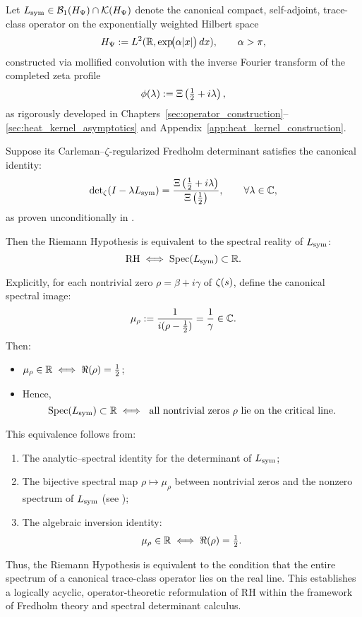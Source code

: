 \begin{theorem}
\label{thm:eq_of_rh}

Let \( L_{\mathrm{sym}} \in \mathcal{B}_1(H_{\Psi}) \cap \mathcal{K}(H_{\Psi}) \) denote the canonical compact, self-adjoint, trace-class operator on the exponentially weighted Hilbert space
\[
H_{\Psi} := L^2(\mathbb{R}, \exp\!\bigl(\alpha |x|\bigr)\,dx), \qquad \alpha > \pi,
\]
constructed via mollified convolution with the inverse Fourier transform of the completed zeta profile
\[
\phi(\lambda) := \Xi\left( \tfrac{1}{2} + i\lambda \right),
\]
as rigorously developed in Chapters~\ref{sec:operator_construction}–\ref{sec:heat_kernel_asymptotics} and Appendix~\ref{app:heat_kernel_construction}.

\medskip

Suppose its Carleman–\(\zeta\)-regularized Fredholm determinant satisfies the canonical identity:
\[
\det\nolimits_\zeta(I - \lambda L_{\mathrm{sym}}) = \frac{\Xi\left( \tfrac{1}{2} + i\lambda \right)}{\Xi\left( \tfrac{1}{2} \right)},
\qquad \forall \lambda \in \mathbb{C},
\]
as proven unconditionally in .

\medskip

Then the Riemann Hypothesis is equivalent to the spectral reality of \( L_{\mathrm{sym}} \):
\[
\mathrm{RH} \iff \operatorname{Spec}(L_{\mathrm{sym}}) \subset \mathbb{R}.
\]

\medskip

\noindent
Explicitly, for each nontrivial zero \( \rho = \beta + i\gamma \) of \( \zeta(s) \), define the canonical spectral image:
\[
\mu_\rho := \frac{1}{i(\rho - \tfrac{1}{2})} = \frac{1}{\gamma} \in \mathbb{C}.
\]
Then:
\begin{itemize}
  \item \( \mu_\rho \in \mathbb{R} \iff \Re(\rho) = \tfrac{1}{2} \);
  \item Hence,
  \[
  \operatorname{Spec}(L_{\mathrm{sym}}) \subset \mathbb{R} \iff \text{ all nontrivial zeros } \rho \text{ lie on the critical line.}
  \]
\end{itemize}

\medskip

\noindent
This equivalence follows from:
\begin{enumerate}
  \item The analytic–spectral identity for the determinant of \( L_{\mathrm{sym}} \);
  \item The bijective spectral map \( \rho \mapsto \mu_\rho \) between nontrivial zeros and the nonzero spectrum of \( L_{\mathrm{sym}} \) (see );
  \item The algebraic inversion identity:
  \[
  \mu_\rho \in \mathbb{R} \iff \Re(\rho) = \tfrac{1}{2}.
  \]
\end{enumerate}

\medskip

\noindent
Thus, the Riemann Hypothesis is equivalent to the condition that the entire spectrum of a canonical trace-class operator lies on the real line. This establishes a logically acyclic, operator-theoretic reformulation of RH within the framework of Fredholm theory and spectral determinant calculus.
\end{theorem}
